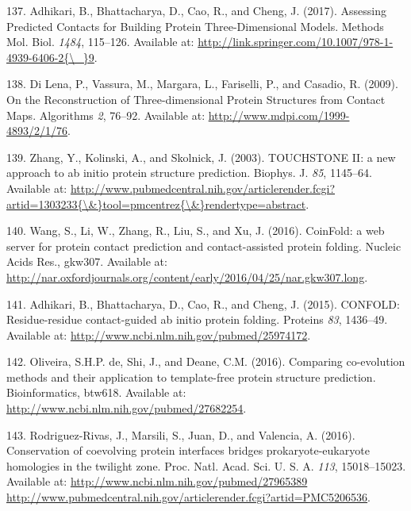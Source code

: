 \documentclass[11pt,a4paper,twoside]{book}
\theoremstyle{definition}
\theoremstyle{definition}
\theoremstyle{remark}
\begin{document}
\hypertarget{ref-Adhikari2017}{}
137. Adhikari, B., Bhattacharya, D., Cao, R., and Cheng, J. (2017).
Assessing Predicted Contacts for Building Protein Three-Dimensional
Models. Methods Mol. Biol. \emph{1484}, 115--126. Available at:
\href{http://link.springer.com/10.1007/978-1-4939-6406-2\%7B/_\%7D9}{http://link.springer.com/10.1007/978-1-4939-6406-2\{\textbackslash{}\_\}9}.

\hypertarget{ref-DiLena2009a}{}
138. Di Lena, P., Vassura, M., Margara, L., Fariselli, P., and Casadio,
R. (2009). On the Reconstruction of Three-dimensional Protein Structures
from Contact Maps. Algorithms \emph{2}, 76--92. Available at:
\url{http://www.mdpi.com/1999-4893/2/1/76}.

\hypertarget{ref-Zhang2003}{}
139. Zhang, Y., Kolinski, A., and Skolnick, J. (2003). TOUCHSTONE II: a
new approach to ab initio protein structure prediction. Biophys. J.
\emph{85}, 1145--64. Available at:
\href{http://www.pubmedcentral.nih.gov/articlerender.fcgi?artid=1303233\%7B/\&\%7Dtool=pmcentrez\%7B/\&\%7Drendertype=abstract}{http://www.pubmedcentral.nih.gov/articlerender.fcgi?artid=1303233\{\textbackslash{}\&\}tool=pmcentrez\{\textbackslash{}\&\}rendertype=abstract}.

\hypertarget{ref-Wang2016}{}
140. Wang, S., Li, W., Zhang, R., Liu, S., and Xu, J. (2016). CoinFold:
a web server for protein contact prediction and contact-assisted protein
folding. Nucleic Acids Res., gkw307. Available at:
\url{http://nar.oxfordjournals.org/content/early/2016/04/25/nar.gkw307.long}.

\hypertarget{ref-Adhikari2015a}{}
141. Adhikari, B., Bhattacharya, D., Cao, R., and Cheng, J. (2015).
CONFOLD: Residue-residue contact-guided ab initio protein folding.
Proteins \emph{83}, 1436--49. Available at:
\url{http://www.ncbi.nlm.nih.gov/pubmed/25974172}.

\hypertarget{ref-DeOliveira2016}{}
142. Oliveira, S.H.P. de, Shi, J., and Deane, C.M. (2016). Comparing
co-evolution methods and their application to template-free protein
structure prediction. Bioinformatics, btw618. Available at:
\url{http://www.ncbi.nlm.nih.gov/pubmed/27682254}.

\hypertarget{ref-Rodriguez-Rivas2016}{}
143. Rodriguez-Rivas, J., Marsili, S., Juan, D., and Valencia, A.
(2016). Conservation of coevolving protein interfaces bridges
prokaryote-eukaryote homologies in the twilight zone. Proc. Natl. Acad.
Sci. U. S. A. \emph{113}, 15018--15023. Available at:
\href{http://www.ncbi.nlm.nih.gov/pubmed/27965389\%20http://www.pubmedcentral.nih.gov/articlerender.fcgi?artid=PMC5206536}{http://www.ncbi.nlm.nih.gov/pubmed/27965389 http://www.pubmedcentral.nih.gov/articlerender.fcgi?artid=PMC5206536}.
\end{document}
